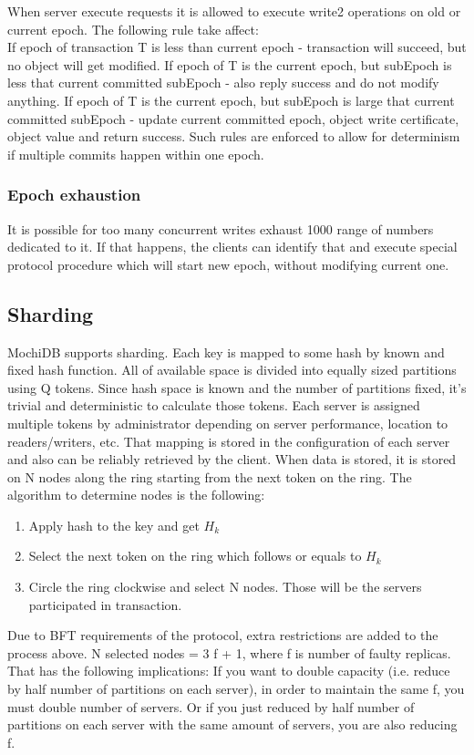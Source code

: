 \documentclass[letterpaper,twocolumn,10pt]{article}
\begin{document}
When server execute requests it is allowed to execute write2 operations on old or current epoch. The following rule take affect:\\ If epoch of transaction T is less than current epoch - transaction will succeed, but no object will get modified. If epoch of T is the current epoch, but subEpoch is less that current committed subEpoch - also reply success and do not modify anything. If epoch of T is the current epoch, but subEpoch is large that current committed subEpoch - update current committed epoch, object write certificate, object value and return success. Such rules are enforced to allow for determinism if multiple commits happen within one epoch.

\subsubsection{Epoch exhaustion}
It is possible for too many concurrent writes exhaust 1000 range of numbers dedicated to it. If that happens, the clients can identify that and execute special protocol procedure which will start new epoch, without modifying current one.

\subsection{Sharding}
MochiDB supports sharding. Each key is mapped to some hash by known and fixed hash function. All of available space is divided into equally sized partitions using Q tokens. Since hash space is known and the number of partitions fixed, it’s trivial and deterministic to calculate those tokens.
Each server is assigned multiple tokens by administrator depending on server performance, location to readers/writers, etc. That mapping is stored in the configuration of each server and also can be reliably retrieved by the client. When data is stored, it is stored on N nodes along the ring starting from the next token on the ring. The algorithm to determine nodes is the following:
\begin{enumerate}
  \item Apply hash to the key and get $H_{k}$
  \item Select the next token on the ring which follows or equals to $H_{k}$
  \item Circle the ring clockwise and select N nodes. Those will be the servers participated in transaction.
\end{enumerate}

Due to BFT requirements of the protocol, extra restrictions are added to the process above. N selected nodes = 3 f + 1, where f is number of faulty replicas. That has the following implications: If you want to double capacity (i.e. reduce by half number of partitions on each server), in order to maintain the same f, you must double number of servers. Or if you just reduced by half number of partitions on each server with the same amount of servers, you are also reducing f.
\end{document}
